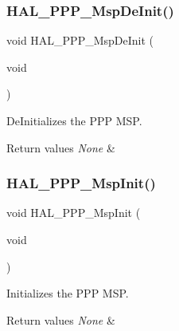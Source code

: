 \subsubsection{\texorpdfstring{H\+A\+L\+\_\+\+P\+P\+P\+\_\+\+Msp\+De\+Init()}{HAL\_PPP\_MspDeInit()}}
{\footnotesize\ttfamily void H\+A\+L\+\_\+\+P\+P\+P\+\_\+\+Msp\+De\+Init (\begin{DoxyParamCaption}\item[{void}]{ }\end{DoxyParamCaption})}



De\+Initializes the P\+PP M\+SP. 


\begin{DoxyRetVals}{Return values}
{\em None} & \\
\hline
\end{DoxyRetVals}
\mbox{\label{group___h_a_l___m_s_p___private___functions_ga4f778ad7de857377eb5493377047e72d}} 
\subsubsection{\texorpdfstring{H\+A\+L\+\_\+\+P\+P\+P\+\_\+\+Msp\+Init()}{HAL\_PPP\_MspInit()}}
{\footnotesize\ttfamily void H\+A\+L\+\_\+\+P\+P\+P\+\_\+\+Msp\+Init (\begin{DoxyParamCaption}\item[{void}]{ }\end{DoxyParamCaption})}



Initializes the P\+PP M\+SP. 


\begin{DoxyRetVals}{Return values}
{\em None} & \\
\hline
\end{DoxyRetVals}
